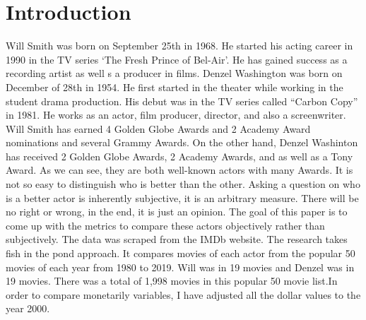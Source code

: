 \documentclass[]{article}
\begin{document}
\vskip -8.5pt




\noindent  

\section{Introduction}
\label{sec:intro}

\noindent  Will Smith was born on September 25th in 1968. He started his
acting career in 1990 in the TV series `The Fresh Prince of Bel-Air'. He
has gained success as a recording artist as well s a producer in films.
Denzel Washington was born on December of 28th in 1954. He first started
in the theater while working in the student drama production. His debut
was in the TV series called ``Carbon Copy'' in 1981. He works as an
actor, film producer, director, and also a screenwriter. Will Smith has
earned 4 Golden Globe Awards and 2 Academy Award nominations and several
Grammy Awards. On the other hand, Denzel Washinton has received 2 Golden
Globe Awards, 2 Academy Awards, and as well as a Tony
Award.\vspace{0.25in} \noindent  As we can see, they are both well-known
actors with many Awards. It is not so easy to distinguish who is better
than the other. Asking a question on who is a better actor is inherently
subjective, it is an arbitrary measure. There will be no right or wrong,
in the end, it is just an opinion. The goal of this paper is to come up
with the metrics to compare these actors objectively rather than
subjectively. The data was scraped from the IMDb website. The research
takes fish in the pond approach. It compares movies of each actor from
the popular 50 movies of each year from 1980 to 2019. Will was in 19
movies and Denzel was in 19 movies. There was a total of 1,998 movies in
this popular 50 movie list.In order to compare monetarily variables, I
have adjusted all the dollar values to the year 2000. \vspace{0.25in}
\end{document}
